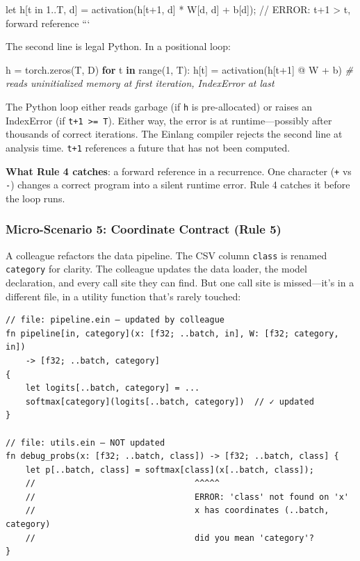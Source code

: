 \documentclass[11pt,titlepage]{article}
\newenvironment{Shaded}{}{}
\newcommand{\BuiltInTok}[1]{#1}
\newcommand{\CommentTok}[1]{\textcolor[rgb]{0.38,0.63,0.69}{\textit{#1}}}
\newcommand{\ControlFlowTok}[1]{\textcolor[rgb]{0.00,0.44,0.13}{\textbf{#1}}}
\newcommand{\DecValTok}[1]{\textcolor[rgb]{0.25,0.63,0.44}{#1}}
\newcommand{\KeywordTok}[1]{\textcolor[rgb]{0.00,0.44,0.13}{\textbf{#1}}}
\newcommand{\NormalTok}[1]{#1}
\newcommand{\OperatorTok}[1]{\textcolor[rgb]{0.40,0.40,0.40}{#1}}
\begin{document}
let h{[}t in 1..T, d{]} = activation(h{[}t+1, d{]} * W{[}d, d{]} +
b{[}d{]}); // ERROR: t+1 \textgreater{} t, forward reference ```

The second line is legal Python. In a positional loop:

\begin{Shaded}
\begin{Highlighting}[]
\NormalTok{h }\OperatorTok{=}\NormalTok{ torch.zeros(T, D)}
\ControlFlowTok{for}\NormalTok{ t }\KeywordTok{in} \BuiltInTok{range}\NormalTok{(}\DecValTok{1}\NormalTok{, T):}
\NormalTok{    h[t] }\OperatorTok{=}\NormalTok{ activation(h[t}\OperatorTok{+}\DecValTok{1}\NormalTok{] }\OperatorTok{@}\NormalTok{ W }\OperatorTok{+}\NormalTok{ b)  }\CommentTok{# reads uninitialized memory at first iteration, IndexError at last}
\end{Highlighting}
\end{Shaded}

The Python loop either reads garbage (if \texttt{h} is pre-allocated) or
raises an IndexError (if \texttt{t+1\ \textgreater{}=\ T}). Either way,
the error is at runtime---possibly after thousands of correct
iterations. The Einlang compiler rejects the second line at analysis
time. \texttt{t+1} references a future that has not been computed.

\textbf{What Rule 4 catches}: a forward reference in a recurrence. One
character (\texttt{+} vs \texttt{-}) changes a correct program into a
silent runtime error. Rule 4 catches it before the loop runs.

\hypertarget{micro-scenario-5-coordinate-contract-rule-5}{%
\subsubsection{Micro-Scenario 5: Coordinate Contract (Rule
5)}\label{micro-scenario-5-coordinate-contract-rule-5}}

A colleague refactors the data pipeline. The CSV column \texttt{class}
is renamed \texttt{category} for clarity. The colleague updates the data
loader, the model declaration, and every call site they can find. But
one call site is missed---it's in a different file, in a utility
function that's rarely touched:

\begin{verbatim}
// file: pipeline.ein — updated by colleague
fn pipeline[in, category](x: [f32; ..batch, in], W: [f32; category, in])
    -> [f32; ..batch, category]
{
    let logits[..batch, category] = ...
    softmax[category](logits[..batch, category])  // ✓ updated
}

// file: utils.ein — NOT updated
fn debug_probs(x: [f32; ..batch, class]) -> [f32; ..batch, class] {
    let p[..batch, class] = softmax[class](x[..batch, class]);
    //                                ^^^^^
    //                                ERROR: 'class' not found on 'x'
    //                                x has coordinates (..batch, category)
    //                                did you mean 'category'?
}
\end{verbatim}
\end{document}
